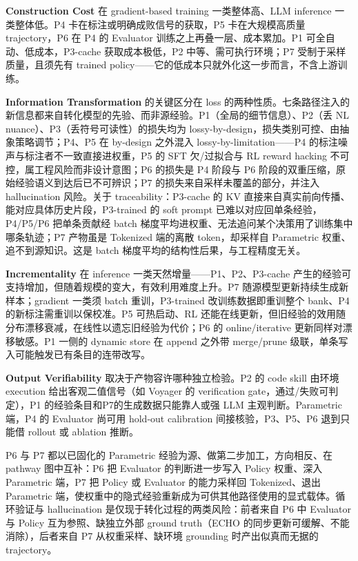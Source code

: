 \textbf{Construction Cost} 在 gradient-based training 一类整体高、LLM inference 一类整体低。P4 卡在标注或明确成败信号的获取，P5 卡在大规模高质量 trajectory，P6 在 P4 的 Evaluator 训练之上再叠一层、成本累加。P1 可全自动、低成本，P3-cache 获取成本极低，P2 中等、需可执行环境；P7 受制于采样质量，且须先有 trained policy——它的低成本只就外化这一步而言，不含上游训练。

\textbf{Information Transformation} 的关键区分在 loss 的两种性质。七条路径注入的新信息都来自转化模型的先验、而非源经验。P1（全局的细节信息）、P2（丢 NL nuance）、P3（丢符号可读性）的损失均为 lossy-by-design，损失类别可控、由抽象策略调节；P4、P5 在 by-design 之外混入 lossy-by-limitation——P4 的标注噪声与标注者不一致直接进权重，P5 的 SFT 欠/过拟合与 RL reward hacking 不可控，属工程风险而非设计意图；P6 的损失是 P4 阶段与 P6 阶段的双重压缩，原始经验语义到达后已不可辨识；P7 的损失来自采样未覆盖的部分，并注入 hallucination 风险。关于 traceability：P3-cache 的 KV 直接来自真实前向传播、能对应具体历史片段，P3-trained 的 soft prompt 已难以对应回单条经验，P4/P5/P6 把单条贡献经 batch 梯度平均进权重、无法追问某个决策用了训练集中哪条轨迹；P7 产物虽是 Tokenized 端的离散 token，却采样自 Parametric 权重、追不到源知识。这是 batch 梯度平均的结构性后果，与工程精度无关。

\textbf{Incrementality} 在 inference 一类天然增量——P1、P2、P3-cache 产生的经验可支持增加，但随着规模的变大，有效利用难度上升。P7 随源模型更新持续生成新样本；gradient 一类须 batch 重训，P3-trained 改训练数据即重训整个 bank、P4 的新标注需重训以保校准。P5 可热启动、RL 还能在线更新，但旧经验的效用随分布漂移衰减，在线性以遗忘旧经验为代价；P6 的 online/iterative 更新同样对漂移敏感。P1 一侧的 dynamic store 在 append 之外带 merge/prune 级联，单条写入可能触发已有条目的连带改写。

\textbf{Output Verifiability} 取决于产物容许哪种独立检验。P2 的 code skill 由环境 execution 给出客观二值信号（如 Voyager 的 verification gate，通过/失败可判定），P1 的经验条目和P7的生成数据只能靠人或强 LLM 主观判断。Parametric 端，P4 的 Evaluator 尚可用 hold-out calibration 间接核验，P3、P5、P6 退到只能借 rollout 或 ablation 推断。

P6 与 P7 都以已固化的 Parametric 经验为源、做第二步加工，方向相反、在 pathway 图中互补：P6 把 Evaluator 的判断进一步写入 Policy 权重、深入 Parametric 端，P7 把 Policy 或 Evaluator 的能力采样回 Tokenized、退出 Parametric 端，使权重中的隐式经验重新成为可供其他路径使用的显式载体。循环验证与 hallucination 是仅现于转化过程的两类风险：前者来自 P6 中 Evaluator 与 Policy 互为参照、缺独立外部 ground truth（ECHO \cite{Li26l} 的同步更新可缓解、不能消除），后者来自 P7 从权重采样、缺环境 grounding 时产出似真而无据的 trajectory。

